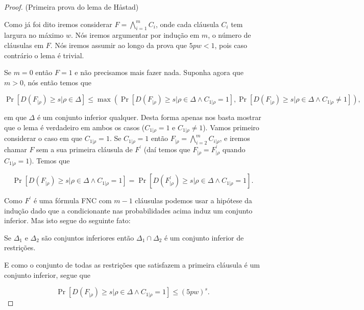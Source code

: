 \begin{proof} (Primeira prova do lema de Håstad)

Como já foi dito iremos considerar  $F = \bigwedge_{i = 1}^{m} C_{i}$, onde cada cláusula $C_{i}$ tem largura no máximo $w$. Nós iremos argumentar por indução em $m$, o número de cláusulas em $F$. Nós iremos assumir ao longo da prova que $5pw < 1$, pois caso contrário o lema é trivial.

Se $m = 0$ então $F = 1$ e não precisamos mais fazer nada. Suponha agora que $m > 0$, nós então temos que

\begin{equation*}
	\Pr[D(F_{\lvert \rho}) \geq s \lvert \rho \in \Delta] \leq \max(\Pr[D(F_{\lvert \rho}) \geq s \lvert \rho \in \Delta \land C_{1 \lvert \rho} = 1], \Pr[D(F_{\lvert \rho}) \geq s \lvert \rho \in \Delta \land C_{1 \lvert \rho} \neq 1]),
\end{equation*}

em que $\Delta$ é um conjunto inferior qualquer. Desta forma apenas nos basta mostrar que o lema é verdadeiro em ambos os casos ($C_{1 \lvert \rho} = 1$ e $C_{1 \lvert \rho} \neq 1$). Vamos primeiro considerar o caso em que $C_{1 \lvert \rho} = 1$. Se $C_{1 \lvert \rho} = 1$ então $F_{\lvert \rho} = \bigwedge_{i  = 2}^{m}C_{i \lvert \rho}$, e iremos chamar $F$ sem a sua primeira cláusula de $F^{\prime}$ (daí temos que $F_{\lvert \rho} = F^{\prime}_{\lvert \rho}$ quando $C_{1 \lvert \rho} = 1$). Temos que

\begin{equation*}
 	\Pr[D(F_{\lvert \rho}) \geq s \lvert \rho \in \Delta \land C_{1 \lvert \rho} = 1] = \Pr[D(F_{\lvert \rho}^{\prime}) \geq s \lvert \rho \in \Delta \land C_{1 \lvert \rho} = 1].
\end{equation*}

Como $F^{\prime}$ é uma fórmula FNC com $m - 1$ cláusulas podemos usar a hipótese da indução dado que a condicionante nas probabilidades acima induz um conjunto inferior. Mas isto segue do seguinte fato:

\begin{fato} \label{downward_closure_closed_intersection}
	Se $\Delta_{1}$ e $\Delta_{2}$ são conjuntos inferiores então $\Delta_{1} \cap \Delta_{2}$ é um conjunto inferior de restrições.
\end{fato}

E como o conjunto de todas as restrições que satisfazem a primeira cláusula é um conjunto inferior, segue que

\begin{equation*}
	\Pr[D(F_{\lvert \rho}) \geq s \lvert \rho \in \Delta \land C_{1 \lvert \rho} = 1] \leq (5pw)^{s}.
\end{equation*}


\end{proof}
